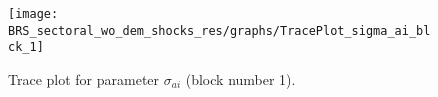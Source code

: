 \begin{figure}[H]
\centering
  \texttt{[image: BRS\_sectoral\_wo\_dem\_shocks\_res/graphs/TracePlot\_sigma\_ai\_blck\_1]}\\
    \caption{Trace plot for parameter ${\sigma_{ai}}$ (block number 1).}
\end{figure}
